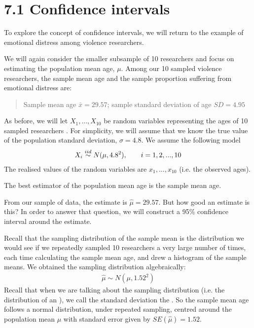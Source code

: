 \documentclass[letterpaper,10pt,english]{jupyterBook}
\begin{document}
\section{7.1 Confidence intervals}
\label{\detokenize{07.b. Frequentist I:confidence-intervals}}\label{\detokenize{07.b. Frequentist I::doc}}
\sphinxAtStartPar
To explore the concept of confidence intervals, we will return to the example of emotional distress among violence researchers.

\sphinxAtStartPar
We will again consider the smaller subsample of 10 researchers and focus on estimating the population mean age, \(\mu\). Among our 10 sampled violence researchers, the sample mean age and the sample proportion suffering from emotional distress are:
\begin{quote}

\sphinxAtStartPar
Sample mean age \(\bar{x}= 29.57\); sample standard deviation of age \(SD = 4.95\)
\end{quote}

\sphinxAtStartPar
{} As before, we will let \(X_1, ...,X_{10}\) be  random variables representing the ages of 10 sampled researchers . For simplicity, we will assume that we know the true value of the population standard deviation, \(\sigma = 4.8\). We assume the following model
\begin{equation*}
\begin{split} 
X_i \overset{\small{iid}}{\sim} N(\mu, 4.8^2), \qquad i=1,2,...,10
\end{split}
\end{equation*}
\sphinxAtStartPar
{} The realised values of the random variables are \(x_1, ..., x_{10}\) (i.e. the observed ages).

\sphinxAtStartPar
{} The best estimator of the population mean age is the sample mean age.

\sphinxAtStartPar
From our sample of data, the estimate is \(\hat{\mu} = 29.57\). But how good an estimate is this? In order to answer that question, we will construct a 95\% confidence interval around the estimate.

\sphinxAtStartPar
{} Recall that the sampling distribution of the sample mean is the distribution we would see if we repeatedly sampled 10 researchers a very large number of times, each time calculating the sample mean age, and drew a histogram of the sample means. We obtained the sampling distribution algebraically:
\begin{equation*}
\begin{split}
\hat{\mu} \sim N(\mu, 1.52^2)
\end{split}
\end{equation*}
\sphinxAtStartPar
Recall that when we are talking about the sampling distribution (i.e. the distribution of an ), we call the standard deviation the . So the sample mean age follows a normal distribution, under repeated sampling, centred around the population mean \(\mu\) with standard error given by \(SE(\hat{\mu}) = 1.52\).
\end{document}
